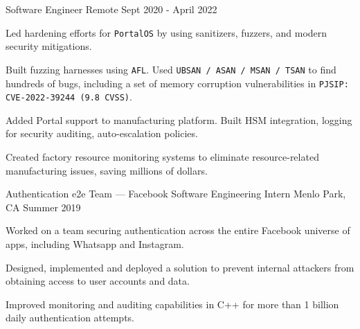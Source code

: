 \begin{cventries}
{Software Engineer} %
{Remote} %
{Sept 2020 - April 2022} %
{
	\begin{cvitems} %
		\item {Led hardening efforts for \texttt{PortalOS} by using sanitizers, fuzzers, and modern security mitigations.} 
		\item {Built fuzzing harnesses using \texttt{AFL}. Used \texttt{UBSAN / ASAN / MSAN / TSAN} to find hundreds of bugs, including a set of memory corruption vulnerabilities in \texttt{PJSIP: CVE-2022-39244 (9.8 CVSS)}.}
		\item {Added Portal support to manufacturing platform. Built HSM integration, logging for security auditing, auto-escalation policies.}
		\item {Created factory resource monitoring systems to eliminate resource-related manufacturing issues, saving millions of dollars.}
	\end{cvitems}
}
\cventry
{Authentication e2e Team — Facebook} %
{Software Engineering Intern} %
{Menlo Park, CA} %
{Summer 2019} %
{
	\begin{cvitems} %
		\item {Worked on a team securing authentication across the entire Facebook universe of apps, including Whatsapp and Instagram.}
		\item {Designed, implemented and deployed a solution to prevent internal attackers from obtaining access to user accounts and data.}
		\item {Improved monitoring and auditing capabilities in C++ for more than 1 billion daily authentication attempts.}
	\end{cvitems}
}

\end{cventries}
